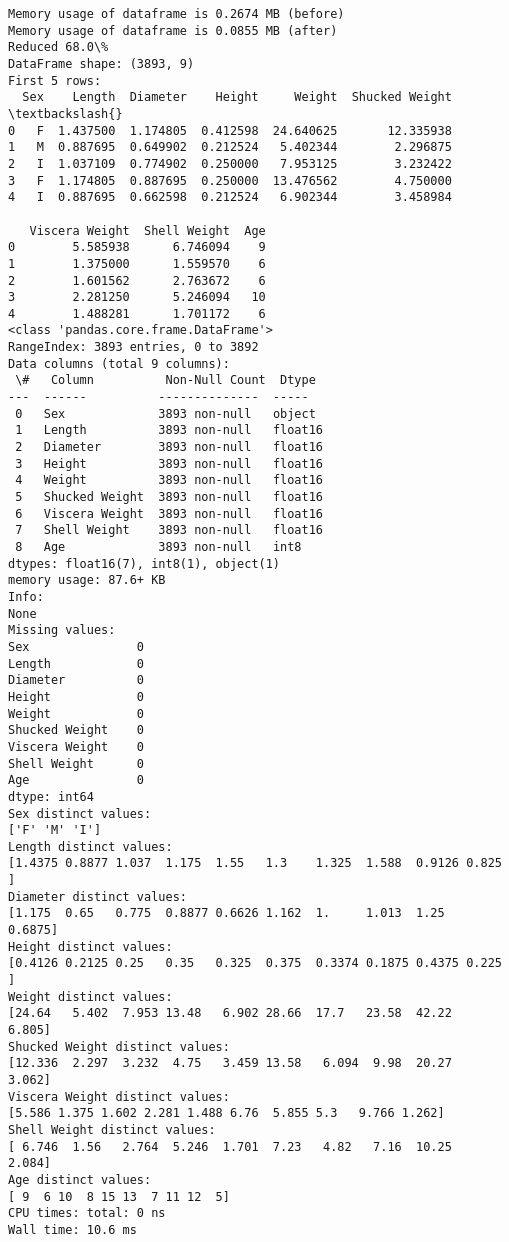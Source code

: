 \documentclass[11pt]{article}
\begin{document}
    \begin{Verbatim}[commandchars=\\\{\}]
Memory usage of dataframe is 0.2674 MB (before)
Memory usage of dataframe is 0.0855 MB (after)
Reduced 68.0\%
DataFrame shape: (3893, 9)
First 5 rows:
  Sex    Length  Diameter    Height     Weight  Shucked Weight  \textbackslash{}
0   F  1.437500  1.174805  0.412598  24.640625       12.335938
1   M  0.887695  0.649902  0.212524   5.402344        2.296875
2   I  1.037109  0.774902  0.250000   7.953125        3.232422
3   F  1.174805  0.887695  0.250000  13.476562        4.750000
4   I  0.887695  0.662598  0.212524   6.902344        3.458984

   Viscera Weight  Shell Weight  Age
0        5.585938      6.746094    9
1        1.375000      1.559570    6
2        1.601562      2.763672    6
3        2.281250      5.246094   10
4        1.488281      1.701172    6
<class 'pandas.core.frame.DataFrame'>
RangeIndex: 3893 entries, 0 to 3892
Data columns (total 9 columns):
 \#   Column          Non-Null Count  Dtype
---  ------          --------------  -----
 0   Sex             3893 non-null   object
 1   Length          3893 non-null   float16
 2   Diameter        3893 non-null   float16
 3   Height          3893 non-null   float16
 4   Weight          3893 non-null   float16
 5   Shucked Weight  3893 non-null   float16
 6   Viscera Weight  3893 non-null   float16
 7   Shell Weight    3893 non-null   float16
 8   Age             3893 non-null   int8
dtypes: float16(7), int8(1), object(1)
memory usage: 87.6+ KB
Info:
None
Missing values:
Sex               0
Length            0
Diameter          0
Height            0
Weight            0
Shucked Weight    0
Viscera Weight    0
Shell Weight      0
Age               0
dtype: int64
Sex distinct values:
['F' 'M' 'I']
Length distinct values:
[1.4375 0.8877 1.037  1.175  1.55   1.3    1.325  1.588  0.9126 0.825 ]
Diameter distinct values:
[1.175  0.65   0.775  0.8877 0.6626 1.162  1.     1.013  1.25   0.6875]
Height distinct values:
[0.4126 0.2125 0.25   0.35   0.325  0.375  0.3374 0.1875 0.4375 0.225 ]
Weight distinct values:
[24.64   5.402  7.953 13.48   6.902 28.66  17.7   23.58  42.22   6.805]
Shucked Weight distinct values:
[12.336  2.297  3.232  4.75   3.459 13.58   6.094  9.98  20.27   3.062]
Viscera Weight distinct values:
[5.586 1.375 1.602 2.281 1.488 6.76  5.855 5.3   9.766 1.262]
Shell Weight distinct values:
[ 6.746  1.56   2.764  5.246  1.701  7.23   4.82   7.16  10.25   2.084]
Age distinct values:
[ 9  6 10  8 15 13  7 11 12  5]
CPU times: total: 0 ns
Wall time: 10.6 ms
    \end{Verbatim}
\end{document}
